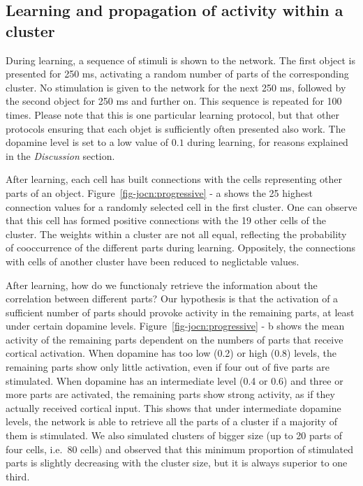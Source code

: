\documentclass[
  11pt,
  a4paper,
]{scrbook}
\begin{document}
\subsection{Learning and propagation of activity within a
cluster}\label{learning-and-propagation-of-activity-within-a-cluster}

During learning, a sequence of stimuli is shown to the network. The
first object is presented for 250 ms, activating a random number of
parts of the corresponding cluster. No stimulation is given to the
network for the next 250 ms, followed by the second object for 250 ms
and further on. This sequence is repeated for 100 times. Please note
that this is one particular learning protocol, but that other protocols
ensuring that each objet is sufficiently often presented also work. The
dopamine level is set to a low value of \(0.1\) during learning, for
reasons explained in the \emph{Discussion} section.

After learning, each cell has built connections with the cells
representing other parts of an object. Figure~\ref{fig-jocn:progressive}
- a shows the 25 highest connection values for a randomly selected cell
in the first cluster. One can observe that this cell has formed positive
connections with the 19 other cells of the cluster. The weights within a
cluster are not all equal, reflecting the probability of cooccurrence of
the different parts during learning. Oppositely, the connections with
cells of another cluster have been reduced to neglictable values.

After learning, how do we functionaly retrieve the information about the
correlation between different parts? Our hypothesis is that the
activation of a sufficient number of parts should provoke activity in
the remaining parts, at least under certain dopamine levels.
Figure~\ref{fig-jocn:progressive} - b shows the mean activity of the
remaining parts dependent on the numbers of parts that receive cortical
activation. When dopamine has too low (0.2) or high (0.8) levels, the
remaining parts show only little activation, even if four out of five
parts are stimulated. When dopamine has an intermediate level (0.4 or
0.6) and three or more parts are activated, the remaining parts show
strong activity, as if they actually received cortical input. This shows
that under intermediate dopamine levels, the network is able to retrieve
all the parts of a cluster if a majority of them is stimulated. We also
simulated clusters of bigger size (up to 20 parts of four cells, i.e.~80
cells) and observed that this minimum proportion of stimulated parts is
slightly decreasing with the cluster size, but it is always superior to
one third.
\end{document}
